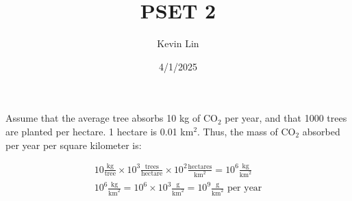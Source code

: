 \documentclass[11pt,a4paper,margin=1in]{article}
\title{PSET 2}
\author{Kevin Lin}
\date{4/1/2025}
\begin{document}
\maketitle
\section{}
\begin{flushleft}
    Assume that the average tree absorbs 10 kg of CO$_2$ per year, and 
    that 1000 trees are planted per hectare. 1 hectare is 0.01 km$^2$. Thus, the mass
    of CO$_2$ absorbed per year per square kilometer is:
\end{flushleft}
\begin{gather*}
    10 \frac{\text{kg}}{\text{tree}} \times 10^3 
        \frac{\text{trees}}{\text{hectare}} \times 10^2 
        \frac{\text{hectares}}{\text{km}^2} = 10^6 
        \frac{\text{kg}}{\text{km}^2}\\
    10^6 \frac{\text{kg}}{\text{km}^2} 
        = 10^6\times10^3 \frac{\text{g}}{\text{km}^2}
        = 10^9 \frac{\text{g}}{\text{km}^2} \text{ per year}\\
\end{gather*}
\end{document}
